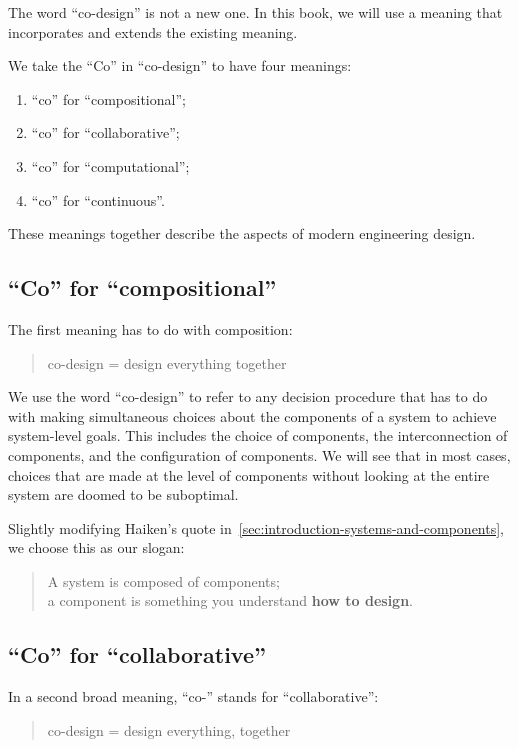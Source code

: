 The word ``co-design'' is not a new one. In this book, we will use
a meaning that incorporates and extends the existing meaning.

We take the ``Co'' in ``co-design'' to have four meanings:
\begin{enumerate}
    \item ``co'' for ``compositional'';
    \item ``co'' for ``collaborative'';
    \item  ``co'' for ``computational'';
    \item   ``co'' for ``continuous''.
\end{enumerate}
These meanings together describe the aspects of modern engineering design.

\subsection{``Co'' for ``compositional''}

The first meaning has to do with composition:

\begin{quote}
    co-design = design everything together
\end{quote}

We use the word ``co-design'' to refer to any decision procedure that has to do with making simultaneous choices about the components of a system to achieve system-level goals.
This includes the choice of components, the interconnection of components, and the configuration of components.
We will see that in most cases, choices that are made at the level of components without looking at the entire system are doomed to be suboptimal.


Slightly modifying Haiken's quote in~\cref{sec:introduction-systems-and-components}, we choose this as our slogan:

\begin{quote}
    A system is composed of components;\\
    a component is something you understand
    \textbf{how to design}.
\end{quote}

\subsection{``Co'' for ``collaborative''}

In a second broad meaning, ``co-'' stands for ``collaborative'':

\begin{quote}
    co-design = design everything, together
\end{quote}


